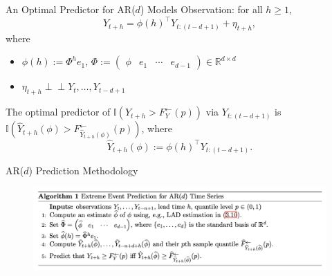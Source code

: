 \documentclass{beamer}
\def\I{\mathbb I}
\def\R{\mathbb R}
\def\Z{{\mathbb Z}}
\def\ind{\perp\!\!\!\perp}
\newcommand\Fi[1]{F_{#1}^{\leftarrow}}
\newcommand{\AROptPred}[3]{\hat{Y}_{#1 + #2}(#3)}
\begin{document}

\begin{frame}{An Optimal Predictor for AR($d$) Models}
    Observation: for all $h \ge 1$,
    \[
    Y_{t + h} = \phi(h)^{\top}Y_{t:(t - d + 1)} + \eta_{t + h},
    \]
    where
    \begin{itemize}
        \item $\phi(h) := \Phi^h e_1$, $\Phi := (\begin{matrix} \phi & e_1 & \cdots & e_{d - 1} \end{matrix}) \in \R^{d \times d}$
        \item $\eta_{t + h} \ind Y_t, \ldots, Y_{t - d + 1}$
    \end{itemize}
    \begin{theorem}
        The optimal predictor of $\I(Y_{t + h} > \Fi{Y}(p))$ via $Y_{t:(t - d + 1)}$ is $\I(\AROptPred{t}{h}{\phi} > F_{\AROptPred{t}{h}{\phi}}^{\leftarrow}(p))$, where
        \[
        \AROptPred{t}{h}{\phi} := \phi(h)^{\top}Y_{t:(t - d + 1)}.
        \]
    \end{theorem}    
\end{frame}

\begin{frame}{AR($d$) Prediction Methodology}
    \begin{figure}[h]
        \centering
        \includegraphics[scale=0.4]{figures/ar_algorithm.png}
        \label{fig:ar_algorithm}
        \end{figure}    
\end{frame}
\end{document}
